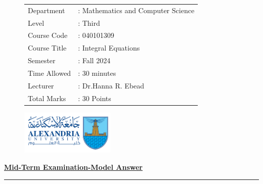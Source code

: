 \documentclass[]{article}
\begin{document}
\thispagestyle{empty}
\begin{figure}
    \begin{minipage}{0.7\textwidth}
            \begin{tabular}{l l}
                Department &: Mathematics and Computer Science \\
                Level &: Third \\
                Course Code &: 040101309                      \\
                Course Title &:  Integral Equations            \\
                Semester &: Fall 2024                        \\
                Time Allowed &: 30 minutes                    \\
                Lecturer &: Dr.Hanna R. Ebead                  \\
                Total Marks &: 30 Points                          \\
            \end{tabular}
    \end{minipage}%
    \begin{minipage}{0.3\textwidth}
        \includegraphics[width=4.5cm]{collagelogo.png}
    \end{minipage}
\end{figure}
\vspace*{-1cm}
\begin{center}
    \textbf{\underline{\LARGE Mid-Term Examination-Model Answer}}
\end{center}
\vspace*{.2cm}

\hrule
\end{document}
